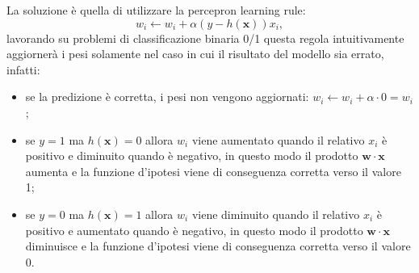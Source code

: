 \documentclass[../../main.tex]{subfiles}
\begin{document}
    La soluzione è quella di utilizzare la percepron learning rule:
    \[w_i \leftarrow w_i + \alpha (y - h(\boldsymbol{x})) x_i, \]
    lavorando su problemi di classificazione binaria 0/1 questa regola intuitivamente aggiornerà i pesi solamente nel caso in cui il risultato del modello sia errato, infatti:
    \begin{itemize}
        \item se la predizione è corretta, i pesi non vengono aggiornati: $w_i \leftarrow w_i + \alpha \cdot 0 = w_i$;
        \item se $y = 1$ ma $h(\boldsymbol{x}) = 0$ allora $w_i$ viene aumentato quando il relativo $x_i$ è positivo e diminuito quando è negativo, in questo modo il prodotto $\boldsymbol{w} \cdot \boldsymbol{x}$ aumenta e la funzione d'ipotesi viene di conseguenza corretta  verso il valore 1;
        \item se $y = 0$ ma $h(\boldsymbol{x}) = 1$ allora $w_i$ viene diminuito quando il relativo $x_i$ è positivo e aumentato quando è negativo, in questo modo il prodotto $\boldsymbol{w} \cdot \boldsymbol{x}$ diminuisce e la funzione d'ipotesi viene di conseguenza corretta verso il valore 0.
    \end{itemize}
\end{document}
